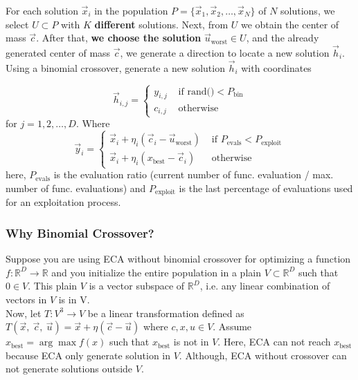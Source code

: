 \documentclass[12pt,letterpape]{article}
\begin{document}
For each solution $\vec{x}_i $ in the population $P = \{ \vec{x}_1, \vec{x}_2, \ldots, \vec{x}_{N} \} $ of $N$ 
solutions, we select $U \subset P $ with $K$ \textbf{different} solutions. Next, 
from $U$ we obtain the center of mass $\vec{c}$. After that, \textbf{we choose the solution} $\vec{u}_{\text{worst}} \in U$,  
and the already generated center of mass $\vec{c}$, we generate a direction 
to locate a new solution $ \vec{h}_i$. Using a binomial crossover, generate a new solution $\vec{h}_{i}$ with coordinates

%
\begin{equation}
	\vec{h}_{i,j} = 
	\begin{cases}
		y_{i,j} & \text{ if rand()} < P_{\text{bin}}\\
		c_{i,j} & \text{ otherwise}
	\end{cases}
	\label{eqn:newSol}
\end{equation}
% 
for $j = 1,2,\ldots,D$. Where 
%
\begin{equation}
	\vec{y}_i = 
	\begin{cases}
		\vec{x}_i + \eta _{i} ( \vec{c}_i - \vec{u}_{ \text{worst} } ) 
		       & \text{ if } P_{\text{evals}} < P_{\text{exploit}} \\
		\vec{x}_i + \eta _{i} ( x_{\text{best}} - \vec{c}_i)
		       & \text{ otherwise}
	\end{cases}
	\label{eqn:vcu}
\end{equation}
%
here, $ P_{\text{evals}}$ is the evaluation ratio (current number of func. evaluation / max. number of func. evaluations) and  $P_{\text{exploit}}$ is the last percentage of evaluations used for an exploitation process.
%


\subsubsection{Why Binomial Crossover?} %
\label{sub:why_binomial_crossover_}

Suppose you are using ECA without binomial crossover for optimizing a function $f:\mathbb{R}^D \to \mathbb{R}$ and you initialize the entire population in a plain $V \subset \mathbb{R}^D $ such that $0 \in V$. This plain $V$ is a vector subspace of $\mathbb{R}^D$, i.e. any linear combination of vectors in $V$ is in V.\\

Now, let $T:V^3 \to V$ be a linear transformation defined as $ T(\vec{x},\ \vec{c},\ \vec{u}) = \vec{x} + \eta ( \vec{c} - \vec{u} )$ where $c,x,u \in V$. Assume $x_\text{best} = \arg \max f(x)$ such that $x_\text{best} $ is not in $V$. Here, ECA can not reach $x_\text{best}$ because ECA only generate solution in $V$. Although, ECA without crossover can not generate solutions outside $V$.
\end{document}
